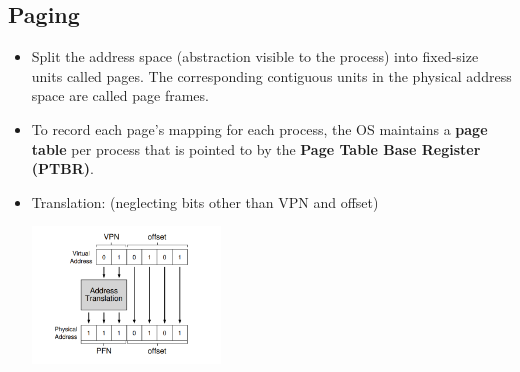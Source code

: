 \documentclass[10pt]{report}
\begin{document}
\subsection{Paging}
\begin{itemize}
\item Split the address space (abstraction visible to the process) 
into fixed-size units called pages. The corresponding contiguous units in the physical address space are called page frames.
\item To record each page's mapping for each process, the OS
maintains a \textbf{page table} per process that is pointed to by the \textbf{Page Table Base Register (PTBR)}.
\item Translation: (neglecting bits other than VPN and offset)
\begin{center}
\includegraphics[width=5cm]{res/paging.png}
\end{center}
\end{itemize}
\end{document}
